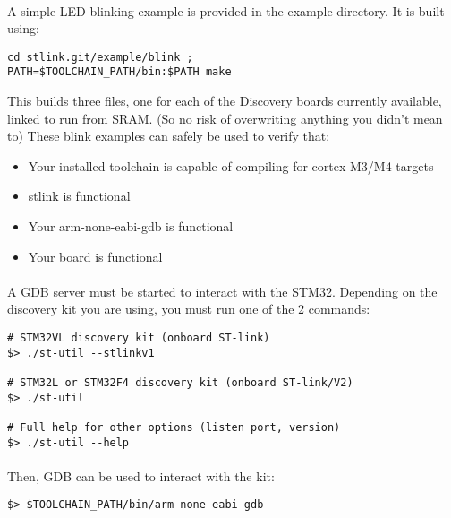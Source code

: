 \documentclass[a4paper, 11pt]{article}
\begin{document}
\paragraph{}
A simple LED blinking example is provided in the example directory. It is built using:\\
\begin{small}
\begin{lstlisting}[frame=tb]
cd stlink.git/example/blink ;
PATH=$TOOLCHAIN_PATH/bin:$PATH make
\end{lstlisting}
\end{small}
This builds three files, one for each of the Discovery boards currently
available, linked to run from SRAM. (So no risk of overwriting anything you didn't mean to) 
These blink examples can safely be used to verify that:

\begin{itemize}
\item Your installed toolchain is capable of compiling for cortex M3/M4 targets
\item stlink is functional
\item Your arm-none-eabi-gdb is functional
\item Your board is functional
\end{itemize}

\paragraph{}
A GDB server must be started to interact with the STM32. Depending on the discovery kit you
are using, you must run one of the 2 commands:\\
\begin{small}
\begin{lstlisting}[frame=tb]
# STM32VL discovery kit (onboard ST-link)
$> ./st-util --stlinkv1

# STM32L or STM32F4 discovery kit (onboard ST-link/V2)
$> ./st-util 

# Full help for other options (listen port, version)
$> ./st-util --help
\end{lstlisting}
\end{small}

\paragraph{}
Then, GDB can be used to interact with the kit:\\
\begin{small}
\begin{lstlisting}[frame=tb]
$> $TOOLCHAIN_PATH/bin/arm-none-eabi-gdb
\end{lstlisting}
\end{small}
\end{document}
